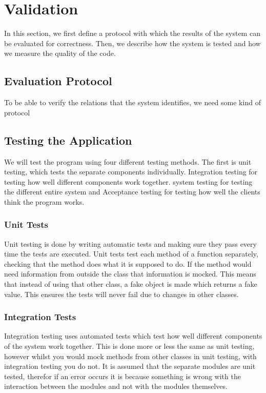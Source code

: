 \section{Validation}
In this section, we first define a protocol with which the results of the system can be evaluated for correctness. Then, we describe how the system is tested and how we measure the quality of the code.

\subsection{Evaluation Protocol}
To be able to verify the relations that the system identifies, we need some kind of protocol 

\subsection{Testing the Application}
We will test the program using four different testing methods. The first is unit testing, which tests the separate components individually. Integration testing for testing how well different components work together. system testing for testing the different entire system and Acceptance testing for testing how well the clients think the program works.

\subsubsection{Unit Tests}
Unit testing is done by writing automatic tests and making sure they pass every time the tests are executed. Unit tests test each method of a function separately, checking that the method does what it is supposed to do. If the method would need information from outside the class that information is mocked. This means that instead of using that other class, a fake object is made which returns a fake value. This ensures the tests will never fail due to changes in other classes.

\subsubsection{Integration Tests}
Integration testing uses automated tests which test how well different components of the system work together. This is done more or less the same as unit testing, however whilst you would mock methods from other classes in unit testing, with integration testing you do not. It is assumed that the separate modules are unit tested, therefor if an error occurs it is because something is wrong with the interaction between the modules and not with the modules themselves. 

